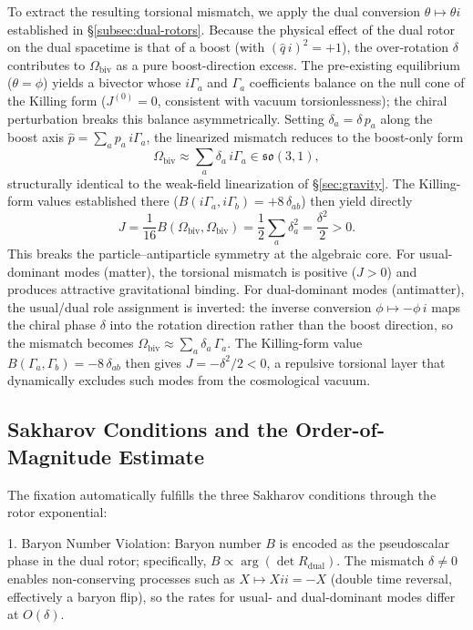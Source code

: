 \documentclass[dvipdfmx,a4paper]{article}
\begin{document}
To extract the resulting torsional mismatch, we apply the dual conversion $\theta \mapsto \theta i$ established in \S\ref{subsec:dual-rotors}. Because the physical effect of the dual rotor on the dual spacetime is that of a boost (with $(\hat q\, i)^2 = +1$), the over-rotation $\delta$ contributes to $\Omega_\text{biv}$ as a pure boost-direction excess. The pre-existing equilibrium ($\theta = \phi$) yields a bivector whose $i\Gamma_a$ and $\Gamma_a$ coefficients balance on the null cone of the Killing form ($J^{(0)} = 0$, consistent with vacuum torsionlessness); the chiral perturbation breaks this balance asymmetrically. Setting $\delta_a = \delta\, p_a$ along the boost axis $\hat p = \sum_a p_a\, i\Gamma_a$, the linearized mismatch reduces to the boost-only form
\[
\Omega_\text{biv} \approx \sum_a \delta_a\, i\Gamma_a \in \mathfrak{so}(3,1),
\]
structurally identical to the weak-field linearization of \S\ref{sec:gravity}. The Killing-form values established there ($B(i\Gamma_a, i\Gamma_b) = +8\,\delta_{ab}$) then yield directly
\[
J = \frac{1}{16} B(\Omega_\text{biv}, \Omega_\text{biv}) = \frac{1}{2}\sum_a \delta_a^2 = \frac{\delta^2}{2} > 0.
\]
This breaks the particle--antiparticle symmetry at the algebraic core. For usual-dominant modes (matter), the torsional mismatch is positive ($J > 0$) and produces attractive gravitational binding. For dual-dominant modes (antimatter), the usual/dual role assignment is inverted: the inverse conversion $\phi \mapsto -\phi\, i$ maps the chiral phase $\delta$ into the rotation direction rather than the boost direction, so the mismatch becomes $\Omega_\text{biv} \approx \sum_a \delta_a\, \Gamma_a$. The Killing-form value $B(\Gamma_a, \Gamma_b) = -8\,\delta_{ab}$ then gives $J = -\delta^2/2 < 0$, a repulsive torsional layer that dynamically excludes such modes from the cosmological vacuum.

\subsection{Sakharov Conditions and the Order-of-Magnitude Estimate}

The fixation automatically fulfills the three Sakharov conditions through the rotor exponential:

1. Baryon Number Violation: Baryon number $B$ is encoded as the pseudoscalar phase in the dual rotor; specifically, $B \propto \arg(\det R_\text{dual})$. The mismatch $\delta \neq 0$ enables non-conserving processes such as $X \mapsto X i i = -X$ (double time reversal, effectively a baryon flip), so the rates for usual- and dual-dominant modes differ at $O(\delta)$.
\end{document}
